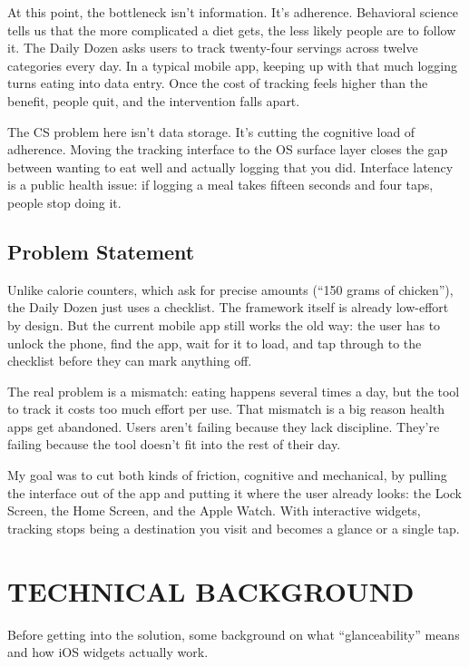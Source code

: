 \documentclass[10pt,twocolumn]{article}
\begin{document}
At this point, the bottleneck isn't information. It's adherence. Behavioral science tells us that the more complicated a diet gets, the less likely people are to follow it. The Daily Dozen asks users to track twenty-four servings across twelve categories every day.\cite{GregerHowNotToDie} In a typical mobile app, keeping up with that much logging turns eating into data entry. Once the cost of tracking feels higher than the benefit, people quit, and the intervention falls apart.

The CS problem here isn't data storage. It's cutting the cognitive load of adherence. Moving the tracking interface to the OS surface layer closes the gap between wanting to eat well and actually logging that you did. Interface latency is a public health issue: if logging a meal takes fifteen seconds and four taps, people stop doing it.

\subsection{Problem Statement}

Unlike calorie counters, which ask for precise amounts (``150 grams of chicken''), the Daily Dozen just uses a checklist.\cite{GregerHowNotToDie} The framework itself is already low-effort by design. But the current mobile app still works the old way: the user has to unlock the phone, find the app, wait for it to load, and tap through to the checklist before they can mark anything off.

The real problem is a mismatch: eating happens several times a day, but the tool to track it costs too much effort per use.\cite{GregerHowNotToDie} That mismatch is a big reason health apps get abandoned. Users aren't failing because they lack discipline. They're failing because the tool doesn't fit into the rest of their day.

My goal was to cut both kinds of friction, cognitive and mechanical, by pulling the interface out of the app and putting it where the user already looks: the Lock Screen, the Home Screen, and the Apple Watch. With interactive widgets, tracking stops being a destination you visit and becomes a glance or a single tap.

\section{TECHNICAL BACKGROUND}

Before getting into the solution, some background on what ``glanceability'' means and how iOS widgets actually work.
\end{document}
